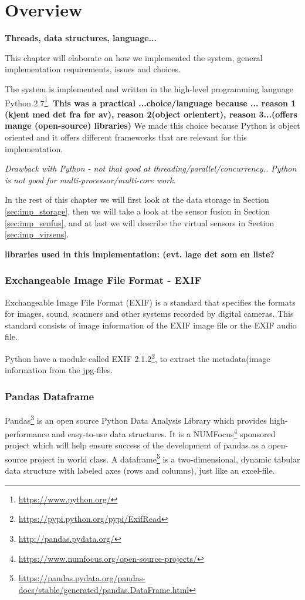 \documentclass[USenglish]{uit-thesis}
\begin{document}
\section{Overview}
\textbf{Threads, data structures, language...}

This chapter will elaborate on how we implemented the system, general implementation requirements, issues and choices.

The system is implemented and written in the high-level programming language Python 2.7\footnote{\url{https://www.python.org/}}. \textbf{ This was a practical ...choice/language because ... reason 1 (kjent med det fra før av), reason 2(object orientert), reason 3...(offers mange (open-source) libraries)}
We made this choice because Python is object oriented and it offers different frameworks that are relevant for this implementation.

\textit{Drawback with Python - not that good at threading/parallel/concurrency.. Python is not good for multi-processor/multi-core work.}


In the rest of this chapter we will first look at the data storage in Section \ref{sec:imp_storage}, then we will take a look at the sensor fusion in Section \ref{sec:imp_senfus}, and at last we will describe the virtual sensors in Section \ref{sec:imp_virsens}.


\textbf{libraries used in this implementation: (evt. lage det som en liste?}

\subsubsection{Exchangeable Image File Format - EXIF} \label{sssec:imp_exif}
Exchangeable Image File Format (EXIF) is a standard that specifies the formats for images, sound, scanners and other systems recorded by digital cameras. This standard consists of image information of the EXIF image file or the EXIF audio file.

Python have a module called  EXIF 2.1.2\footnote{\url{https://pypi.python.org/pypi/ExifRead}}, to extract the metadata(image information from the jpg-files.

\subsubsection{Pandas Dataframe} \label{sssec:imp_df}
Pandas\footnote{\url{http://pandas.pydata.org/}} is an open source Python Data Analysis Library which provides high-performance and easy-to-use data structures. It is a NUMFocus\footnote{\url{https://www.numfocus.org/open-source-projects/}} sponsored project which will help ensure success of the development of pandas as a open-source project in world class. A dataframe\footnote{\url{https://pandas.pydata.org/pandas-docs/stable/generated/pandas.DataFrame.html}} is a two-dimensional, dynamic tabular data structure with labeled axes (rows and columns), just like an excel-file.
\end{document}
